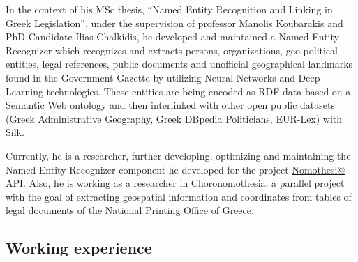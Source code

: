 \documentclass[a4paper,oneside,11pt]{article}
\begin{document}
\begin{sloppypar}
	In the context of his MSc thesis, ``Named Entity Recognition and Linking in Greek Legislation'',
	under the supervision of professor Manolis Koubarakis and PhD Candidate Ilias Chalkidis, he
	developed and maintained a Named Entity Recognizer which recognizes and extracts persons,
	organizations, geo-political entities, legal references, public documents and unofficial
	geographical landmarks found in the Government Gazette by utilizing Neural Networks and Deep Learning
	technologies. These entities are being encoded as RDF data based on a Semantic Web ontology and
	then interlinked with other open public datasets (Greek Administrative Geography, Greek
	DBpedia Politicians, EUR-Lex) with Silk.
\end{sloppypar}

\begin{sloppypar}
	Currently, he is a researcher, further developing, optimizing and maintaining the Named Entity Recognizer
	component he developed for the project \href{http://legislation.di.uoa.gr}{Nomothesi@} API. Also, he is working as a researcher in Choronomothesia, 
	a parallel project with the goal of extracting geospatial information and coordinates from tables of legal documents of the National Printing Office of Greece.
\end{sloppypar}

\subsection*{Working experience}
\end{document}
